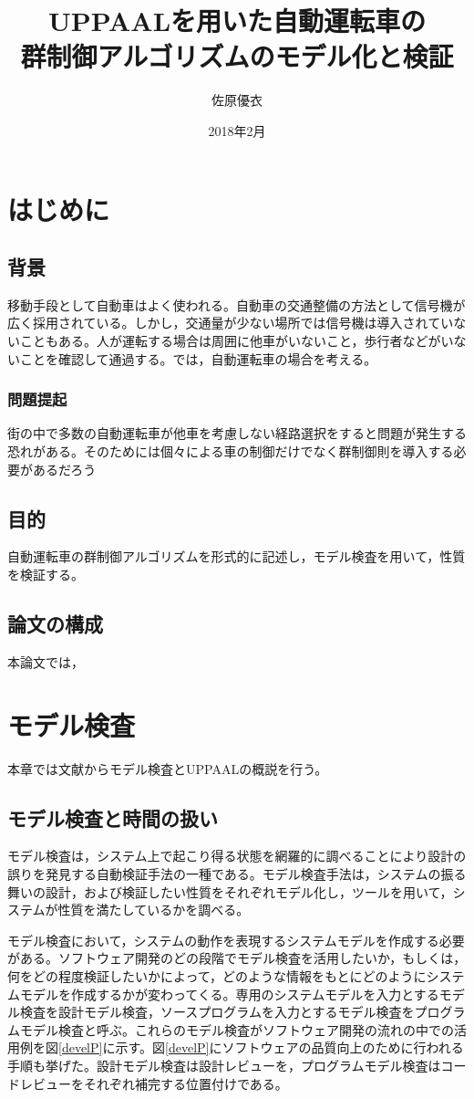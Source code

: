 \documentclass{tpu-sotu}
\title{UPPAALを用いた自動運転車の\\群制御アルゴリズムのモデル化と検証}
\author{佐原優衣}
\date{2018年2月}
\begin{document}
\maketitle
\clearpage
{}
\setcounter{tocdepth}{3}
\tableofcontents
\clearpage
{}

\chapter{はじめに}
	\section{背景}
	移動手段として自動車はよく使われる。自動車の交通整備の方法として信号機が広く採用されている。しかし，交通量が少ない場所では信号機は導入されていないこともある。人が運転する場合は周囲に他車がいないこと，歩行者などがいないことを確認して通過する。では，自動運転車の場合を考える。
		\subsection{問題提起}
		街の中で多数の自動運転車が他車を考慮しない経路選択をすると問題が発生する恐れがある。そのためには個々による車の制御だけでなく群制御則を導入する必要があるだろう
	\section{目的}
	自動運転車の群制御アルゴリズムを形式的に記述し，モデル検査を用いて，性質を検証する。
	\section{論文の構成}
	本論文では，
\chapter{モデル検査}
本章では文献\cite{a1}からモデル検査とUPPAALの概説を行う。
	\section{モデル検査と時間の扱い}
	モデル検査は，システム上で起こり得る状態を網羅的に調べることにより設計の誤りを発見する自動検証手法の一種である。モデル検査手法は，システムの振る舞いの設計，および検証したい性質をそれぞれモデル化し，ツールを用いて，システムが性質を満たしているかを調べる。
	
	モデル検査において，システムの動作を表現するシステムモデルを作成する必要がある。ソフトウェア開発のどの段階でモデル検査を活用したいか，もしくは，何をどの程度検証したいかによって，どのような情報をもとにどのようにシステムモデルを作成するかが変わってくる。専用のシステムモデルを入力とするモデル検査を設計モデル検査，ソースプログラムを入力とするモデル検査をプログラムモデル検査と呼ぶ。これらのモデル検査がソフトウェア開発の流れの中での活用例を図\ref{develP}に示す。図\ref{develP}にソフトウェアの品質向上のために行われる手順も挙げた。設計モデル検査は設計レビューを，プログラムモデル検査はコードレビューをそれぞれ補完する位置付けである。
	
\end{document}
